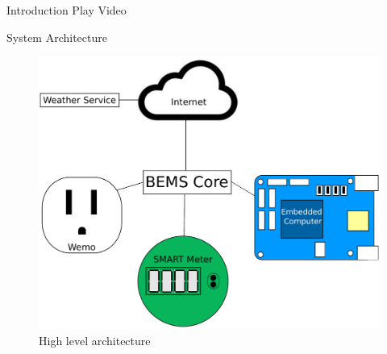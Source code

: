 \documentclass{beamer}
\begin{document}
\begin{frame}{Introduction}{}
\centering
Play Video
\end{frame}

\begin{frame}{System Architecture}{} %
    \begin{figure}
        \centering
        \includegraphics[scale=0.4]{figs/highLevelArchitecture.pdf}
        \caption{High level architecture}
        \label{fig:my_label}
    \end{figure}
\end{frame}
\end{document}
